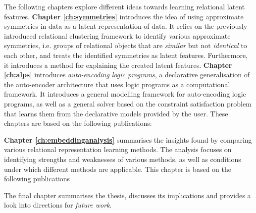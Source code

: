The following chapters explore different ideas towards learning relational latent features.
\textbf{Chapter \ref{ch:symmetries}} introduces the idea of using approximate symmetries in data as a latent representation of data.
It relies on the previously introduced relational clustering framework to identify various approximate symmetries, i.e. groups of relational objects that are \textit{similar} but not \textit{identical} to each other, and treats the identified symmetries as latent features.
Furthermore, it introduces a method for explaining the created latent features.
\textbf{Chapter \ref{ch:alps}} introduces \textit{auto-encoding logic programs}, a declarative generalisation of the auto-encoder architecture \cite{Hinton504} that uses logic programs as a computational framework.
It introduces a general modelling framework for auto-encoding logic programs, as well as a general solver based on the constraint satisfaction problem that learns them from the declarative models provided by the user.
These chapters are based on the following publications:

\begin{quote}
\end{quote}

\begin{quote}
\end{quote}

\begin{quote}
\end{quote}

\begin{quote}
\end{quote}


\textbf{Chapter \ref{ch:embeddinganalysis}} summarises the insights found by comparing various relational representation learning methods.
The analysis focuses on identifying strengths and weaknesses of various methods, as well as conditions under which different methods are applicable.
This chapter is based on the following publications

\begin{quote}
\end{quote}

\begin{quote}
\end{quote}

\begin{quote}
\end{quote}


The final chapter summarises the thesis, discusses its implications and provides a look into directions for \textit{future work}.







\cleardoublepage


